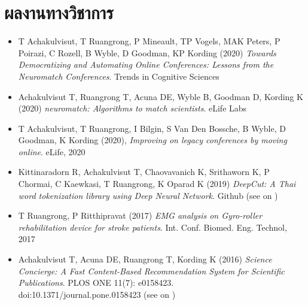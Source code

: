 \section{\sc ผลงานทางวิชาการ}

\begin{itemize}[leftmargin=0cm, label={}]

\item T Achakulvisut, T Ruangrong, P Mineault, TP Vogels, MAK Peters, P Poirazi, C Rozell, B Wyble, D Goodman, KP Kording (2020) {\em Towards Democratizing and Automating Online Conferences: Lessons from the Neuromatch Conferences}. Trends in Cognitive Sciences

\item Achakulvisut T, Ruangrong T, Acuna DE, Wyble B,  Goodman D, Kording K (2020) {\em neuromatch: Algorithms to match scientists}. eLife Labs

\item T Achakulvisut, T Ruangrong, I Bilgin, S Van Den Bossche, B Wyble, D Goodman, K Kording (2020), {\em Improving on legacy conferences by moving online}. eLife, 2020

\item Kittinaradorn R, Achakulvisut T, Chaovavanich K, Srithaworn K, P Chormai, C Kaewkasi, T Ruangrong, K Oparad K (2019) {\em  DeepCut: A Thai word tokenization library using Deep Neural Network}. Github (see on \href{https://github.com/rkcosmos/deepcut}{\faGithubAlt})

\item T Ruangrong, P Ritthipravat (2017) {\em EMG analysis on Gyro-roller rehabilitation device for stroke patients}. Int. Conf. Biomed. Eng. Technol, 2017

\item Achakulvisut T, Acuna DE, Ruangrong T, Kording K (2016) {\em Science Concierge: A Fast Content-Based Recommendation System for Scientific Publications}. PLOS ONE 11(7): e0158423.\\ doi:10.1371/journal.pone.0158423 
(see on \href{https://github.com/titipata/science_concierge}{\faGithubAlt})


\end{itemize}
